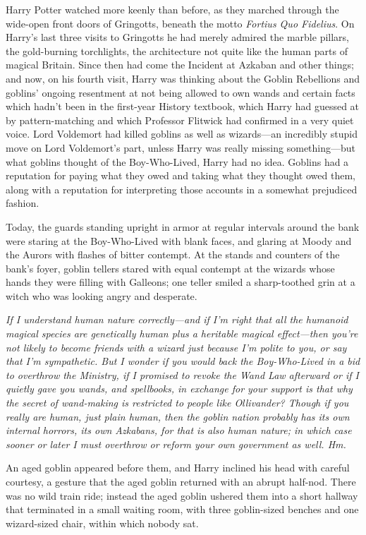 Harry Potter watched more keenly than before, as they marched through the
wide-open front doors of Gringotts, beneath the motto \emph{Fortius Quo
Fidelius}. On Harry's last three visits to Gringotts he had merely admired the
marble pillars, the gold-burning torchlights, the architecture not quite like
the human parts of magical Britain. Since then had come the Incident at Azkaban
and other things; and now, on his fourth visit, Harry was thinking about the
Goblin Rebellions and goblins' ongoing resentment at not being allowed to own
wands and certain facts which hadn't been in the first-year History textbook,
which Harry had guessed at by pattern-matching and which Professor Flitwick had
confirmed in a very quiet voice. Lord Voldemort had killed goblins as well as
wizards—an incredibly stupid move on Lord Voldemort's part, unless Harry was
really missing something—but what goblins thought of the Boy-Who-Lived, Harry
had no idea. Goblins had a reputation for paying what they owed and taking what
they thought owed them, along with a reputation for interpreting those accounts
in a somewhat prejudiced fashion.

Today, the guards standing upright in armor at regular intervals around the
bank were staring at the Boy-Who-Lived with blank faces, and glaring at Moody
and the Aurors with flashes of bitter contempt. At the stands and counters of
the bank's foyer, goblin tellers stared with equal contempt at the wizards
whose hands they were filling with Galleons; one teller smiled a sharp-toothed
grin at a witch who was looking angry and desperate.

\emph{If I understand human nature correctly—and if I'm right that all the
humanoid magical species are genetically human plus a heritable magical
effect—then you're not likely to become friends with a wizard just because
I'm polite to you, or say that I'm sympathetic. But I wonder if you would back
the Boy-Who-Lived in a bid to overthrow the Ministry, if I promised to revoke
the Wand Law afterward{\el} or if I quietly gave you wands, and spellbooks,
in exchange for your support{\el} is that why the secret of wand-making is
restricted to people like Ollivander? Though if you really are human, just
plain human, then the goblin nation probably has its own internal horrors, its
own Azkabans, for that is also human nature; in which case sooner or later I
must overthrow or reform your own government as well. Hm.}

An aged goblin appeared before them, and Harry inclined his head with careful
courtesy, a gesture that the aged goblin returned with an abrupt half-nod.
There was no wild train ride; instead the aged goblin ushered them into a short
hallway that terminated in a small waiting room, with three goblin-sized
benches and one wizard-sized chair, within which nobody sat.

